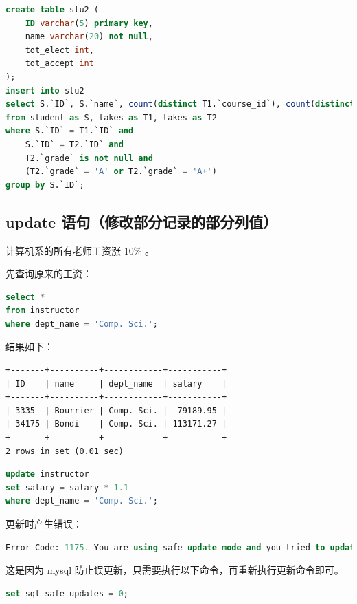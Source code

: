 \documentclass{article}
\begin{document}
\begin{lstlisting}[language=sql]
create table stu2 (
	ID varchar(5) primary key,
    name varchar(20) not null,
    tot_elect int,
    tot_accept int
);
insert into stu2
select S.`ID`, S.`name`, count(distinct T1.`course_id`), count(distinct T2.`course_id`)
from student as S, takes as T1, takes as T2
where S.`ID` = T1.`ID` and 
	S.`ID` = T2.`ID` and 
	T2.`grade` is not null and
    (T2.`grade` = 'A' or T2.`grade` = 'A+') 
group by S.`ID`;
\end{lstlisting}

\subsection{update 语句（修改部分记录的部分列值）}

计算机系的所有老师工资涨 10\% 。

先查询原来的工资：

\begin{lstlisting}[language=sql]
select *
from instructor
where dept_name = 'Comp. Sci.';
\end{lstlisting}

结果如下：

\begin{lstlisting}
+-------+----------+------------+-----------+
| ID    | name     | dept_name  | salary    |
+-------+----------+------------+-----------+
| 3335  | Bourrier | Comp. Sci. |  79189.95 |
| 34175 | Bondi    | Comp. Sci. | 113171.27 |
+-------+----------+------------+-----------+
2 rows in set (0.01 sec)

\end{lstlisting}

\begin{lstlisting}[language=sql]
update instructor
set salary = salary * 1.1
where dept_name = 'Comp. Sci.';
\end{lstlisting}

更新时产生错误：

\begin{lstlisting}[language=sql]
Error Code: 1175. You are using safe update mode and you tried to update a table without a WHERE that uses a KEY column To disable safe mode, toggle the option in Preferences -> SQL Queries and reconnect.
\end{lstlisting}

这是因为 mysql 防止误更新，只需要执行以下命令，再重新执行更新命令即可。

\begin{lstlisting}[language=sql]
set sql_safe_updates = 0;
\end{lstlisting}
\end{document}
